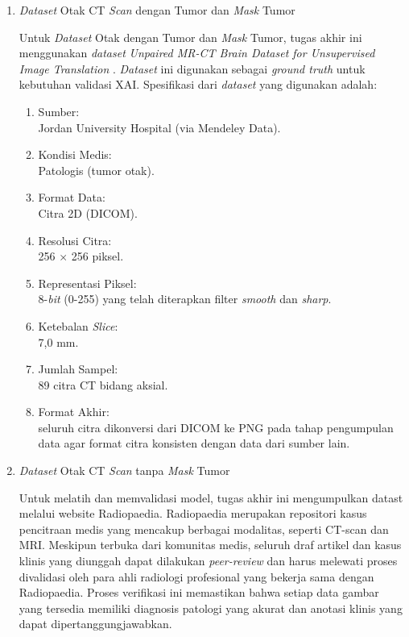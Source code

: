\begin{enumerate}	
	\item \textit{Dataset} Otak CT \textit{Scan} dengan Tumor dan \textit{Mask} Tumor
	
	Untuk \textit{Dataset} Otak dengan Tumor dan \textit{Mask} Tumor, tugas akhir ini menggunakan \textit{dataset} \textit{Unpaired MR-CT Brain Dataset for Unsupervised Image Translation} \cite{AlKadi2022Unpaired}. \textit{Dataset} ini digunakan sebagai \textit{ground truth} untuk kebutuhan validasi XAI. Spesifikasi dari \textit{dataset} yang digunakan adalah:
	
	\begin{enumerate}
		\item Sumber: \\ Jordan University Hospital (via Mendeley Data).
		\item Kondisi Medis: \\ Patologis (tumor otak).
		\item Format Data: \\ Citra 2D (DICOM).
		\item Resolusi Citra: \\ 256 $\times$ 256 piksel.
		\item Representasi Piksel: \\ 8-\textit{bit} (0-255) yang telah diterapkan filter \textit{smooth} dan \textit{sharp}.
		\item Ketebalan \textit{Slice}: \\ 7,0 mm.
		\item Jumlah Sampel: \\ 89 citra CT bidang aksial.
		\item Format Akhir: \\ seluruh citra dikonversi dari DICOM ke PNG pada tahap pengumpulan data agar format citra konsisten dengan data dari sumber lain.
	\end{enumerate}
	
	\item \textit{Dataset} Otak CT \textit{Scan} tanpa \textit{Mask} Tumor
	
	Untuk melatih dan memvalidasi model, tugas akhir ini mengumpulkan datast melalui website Radiopaedia. Radiopaedia merupakan repositori kasus pencitraan medis yang mencakup berbagai modalitas, seperti CT-scan dan MRI. Meskipun terbuka dari komunitas medis, seluruh draf artikel dan kasus klinis yang diunggah dapat dilakukan \textit{peer-review} dan harus melewati proses divalidasi oleh para ahli radiologi profesional yang bekerja sama dengan Radiopaedia. Proses verifikasi ini memastikan bahwa setiap data gambar yang tersedia memiliki diagnosis patologi yang akurat dan anotasi klinis yang dapat dipertanggungjawabkan.
	

\end{enumerate}
